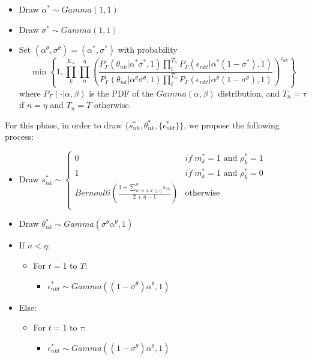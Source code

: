 \documentclass[12pt]{article}
\begin{document}
\begin{itemize}
	\item Draw $\alpha^* \sim Gamma(1,1)$
	\item Draw $\sigma^* \sim Gamma(1,1)$
	\item Set $(\alpha^\theta,\sigma^\theta)=(\alpha^*,\sigma^*)$ with probability $$\min\left\{ 1 , \prod_{k}^{K_+} \prod_{n}^{\eta} \left( \frac{ 
		P_\Gamma(\theta_{nk}|\alpha^* \sigma^*,1) \prod_{t}^{T_n} P_\Gamma(\epsilon_{nkt}|\alpha^* (1-\sigma^*),1) 
	}{
		P_\Gamma(\theta_{nk}|\alpha^\theta \sigma^\theta,1) \prod_{t}^{T_n} P_\Gamma(\epsilon_{nkt}|\alpha^\theta (1-\sigma^\theta),1) 
	} \right)^{z_{nk}} \right\}$$
	where $P_\Gamma(\cdot|\alpha,\beta)$ is the PDF of the $Gamma(\alpha,\beta)$ distribution, and $T_n=\tau$ if $n=\eta$ and $T_n=T$ otherwise.
\end{itemize}


For this phase, in order to draw $\{s^*_{nk},\theta^*_{nk},\{\epsilon^*_{nkt}\}\}$, we propose the following process:

\begin{itemize}
	\item Draw $s^*_{n k} \sim \left\{ \begin{array}{cl}
	0 & if \; m^*_k=1 \text{ and } \rho^*_k=1 \\
	1 & if \; m^*_k=1 \text{ and } \rho^*_k=0 \\
	Bernoulli(\frac{1 + \sum_{n'\neq n, n'\leq\eta}^{\eta} s_{nk}}{2+\eta-1}) & \text{otherwise}\\
	\end{array}\right.$
	\item Draw $\theta^*_{n k} \sim Gamma(\sigma^\theta \alpha^\theta,1)$
	\item If $n<\eta$:
	\begin{itemize}
		\item For $t=1$ to $T$:
		\begin{itemize}
			\item $\epsilon^*_{n k t} \sim Gamma((1-\sigma^\theta) \alpha^\theta,1)$
		\end{itemize} 
	\end{itemize}
	\item Else:
	\begin{itemize}
		\item For $t=1$ to $\tau$:
		\begin{itemize}
			\item $\epsilon^*_{n k t} \sim Gamma((1-\sigma^\theta) \alpha^\theta,1)$
		\end{itemize} 
	\end{itemize}
	
\end{itemize}

{}

\end{document}
